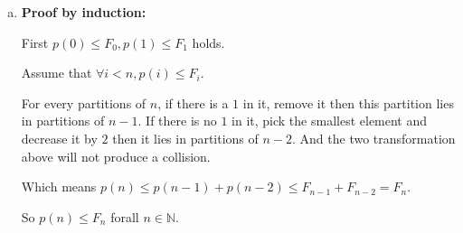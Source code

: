 \documentclass{article}
\begin{document}
\begin{itemize}
\begin{enumerate}[(a)]
            \item
                \textbf{Proof by induction:}
                    
                First $p(0) \le F_0, p(1) \le F_1$ holds.

                Assume that $\forall i < n, p(i) \le F_i$.

                For every partitions of $n$, if there is a $1$ in it, remove it then
                this partition lies in partitions of $n-1$. If there is no $1$ in it,
                pick the smallest element and decrease it by $2$ then it lies in
                partitions of $n-2$. And the two transformation above will not produce
                a collision.

                Which means $p(n) \le p(n - 1) + p(n - 2) \le F_{n-1} + F_{n-2} = F_n$.

                So $p(n) \le F_n$ forall $n \in \mathbb{N}$.
        \end{enumerate}

\end{itemize}
\end{document}
